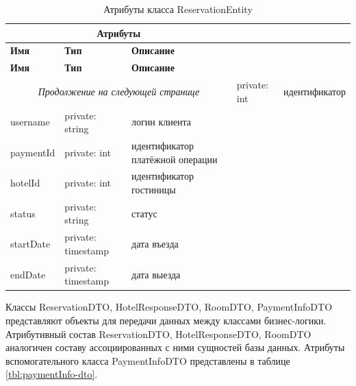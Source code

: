\begin{longtable}{| p{3cm} | p{5cm} | p{8cm} |}
	\caption{Атрибуты класса ReservationEntity}
	\label{tbl:reservation-entity} \\
	\hline
	
	\multicolumn{3}{|c|}{\textbf{Атрибуты}} \\
	\hline
	
	\textbf{Имя} & \textbf{Тип} & \textbf{Описание} \\
	\hline
	\endfirsthead
	
	\hline
	\textbf{Имя} & \textbf{Тип} & \textbf{Описание} \\
	\hline
	\endhead
	
	\hline
	\multicolumn{3}{c}{\textit{Продолжение на следующей странице}}
	\endfoot
	\hline
	\endlastfoot
	
	id
	&
	private: int
	&
	идентификатор \\
	\hline
	
	username
	&
	private: string
	&
	логин клиента \\
	\hline
	
	paymentId
	&
	private: int
	&
	идентификатор платёжной операции \\
	\hline
	
	hotelId
	&
	private: int
	&
	идентификатор гостиницы \\
	\hline
	
	status
	&
	private: string
	&
	статус \\
	\hline
	
	startDate
	&
	private: timestamp
	&
	дата въезда \\
	\hline
	 
	endDate
	&
	private: timestamp
	&
	дата выезда \\
\end{longtable}

Классы ReservationDTO, HotelResponseDTO, RoomDTO, PaymentInfoDTO представляют объекты для передачи данных между классами бизнес-логики. Атрибутивный состав ReservationDTO, HotelResponseDTO, RoomDTO аналогичен составу ассоциированных с ними сущностей базы данных.  Атрибуты вспомогательного класса PaymentInfoDTO представлены в таблице \ref{tbl:paymentInfo-dto}.

